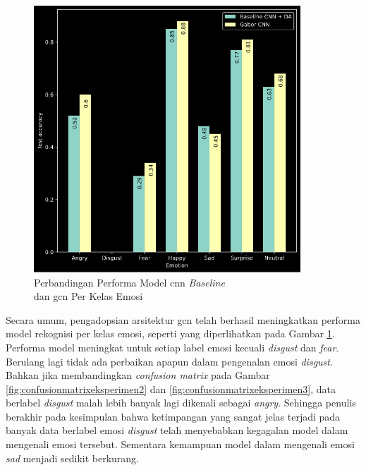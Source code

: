 \begin{figure}[t]
    \centering
    \includegraphics[width=10cm]{gambar/eksperimen2vs3_grafik1.png}
    \caption{Perbandingan Performa Model \acrshort{cnn} \textit{Baseline}\\dan \acrshort{gcn} Per Kelas Emosi}
    \label{fig:perbandinganeksperimen2dan3}
\end{figure}
Secara umum, pengadopsian arsitektur \acrshort{gcn} telah berhasil meningkatkan performa model rekognisi per kelas emosi, seperti yang diperlihatkan pada Gambar \ref{fig:perbandinganeksperimen2dan3}. Performa model meningkat untuk setiap label emosi kecuali \textit{disgust} dan \textit{fear}. Berulang lagi tidak ada perbaikan apapun dalam pengenalan emosi \textit{disgust}. Bahkan jika membandingkan \textit{confusion matrix} pada Gambar \ref{fig:confusionmatrixeksperimen2} dan \ref{fig:confusionmatrixeksperimen3}, data berlabel \textit{disgust} malah lebih banyak lagi dikenali sebagai \textit{angry}. Sehingga penulis berakhir pada kesimpulan bahwa ketimpangan yang sangat jelas terjadi pada banyak data berlabel emosi \textit{disgust} telah menyebabkan kegagalan model dalam mengenali emosi tersebut. Sementara kemampuan model dalam mengenali emosi \textit{sad} menjadi sedikit berkurang.


